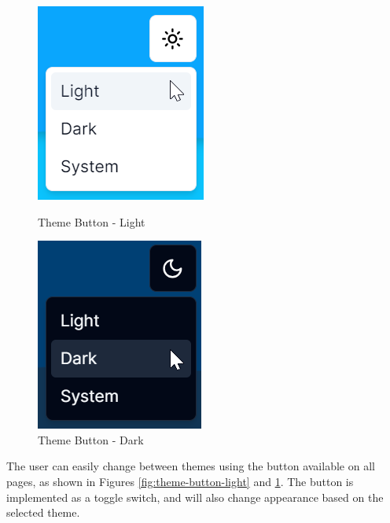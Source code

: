 \begin{figure}[h]
    \centering
    \begin{minipage}{0.45\textwidth}
        \centering
        \includegraphics[width=0.5\linewidth]{images/theme-button-light.png}
        \caption{Theme Button - Light}
        \label{fig:theme-button-light}
    \end{minipage}%
    \hspace{0.1\textwidth}%
    \begin{minipage}{0.45\textwidth}
        \centering
        \includegraphics[width=0.5\linewidth]{images/theme-button-dark.png}
        \caption{Theme Button - Dark}
        \label{fig:ftheme-button-dark}
    \end{minipage}
\end{figure}

\noindent The user can easily change between themes using the button available on all pages, as shown in Figures \ref{fig:theme-button-light} and \ref{fig:ftheme-button-dark}. The button is implemented as a toggle switch, and will also change appearance based on the selected theme.

